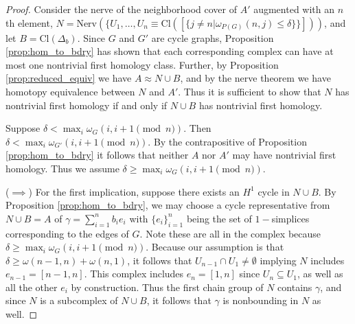 \documentclass[pdflatex,bst/sn-mathphys-num]{sn-jnl}%
\newcommand{\toti}[1] {{\textcolor{pink}{{\sf Tobias: } #1}}}
\theoremstyle{thmstyleone}%
\theoremstyle{definition}
\theoremstyle{thmstyletwo}%
\theoremstyle{thmstylethree}%
\begin{document}
\begin{proof}
     Consider the nerve of the neighborhood cover of $A'$ augmented with an $n$th element, $N=$Nerv$\left(\{U_1,\dotsc,U_n\equiv\text{Cl}([\{j\neq n | \omega_{P(G)}(n,j)\leq \delta\}\}])\right)$, and let $B=\text{Cl}(\Delta_b)$. Since $G$ and $G'$ are cycle graphs, Proposition \ref{prop:hom_to_bdry} has shown that each corresponding complex can have at most one nontrivial first homology class. Further, by Proposition \ref{prop:reduced_equiv} we have $A\approx N\cup B$, and by the nerve theorem we have homotopy equivalence between $N$ and $A'$. Thus it is sufficient to show that $N$ has nontrivial first homology if and only if $N\cup B$ has nontrivial first homology. 

     Suppose $\delta<\max_i \omega_G(i,i+1\pmod{n})$. Then $\delta<\max_i \omega_{G'}(i,i+1\pmod{n})$. By the contrapositive of Proposition \ref{prop:hom_to_bdry} it follows that neither $A$ nor $A'$ may have nontrivial first homology. Thus we assume $\delta\geq \max_i \omega_G(i,i+1\pmod{n})$.

     ($\implies$) For the first implication, suppose there exists an $H^1$ cycle in $N\cup B$. By Proposition \ref{prop:hom_to_bdry}, we may choose a cycle representative from $N\cup B= A$ of $\gamma=\sum_{i=1}^n b_i e_i$ with $\{e_i\}_{i=1}^n$ being the set of $1-$simplices corresponding to the edges of $G$. Note these are all in the complex because $\delta\geq \max_i \omega_G(i,i+1\pmod{n})$. Because our assumption is that $\delta\geq \omega(n-1,n)+\omega(n,1)$, it follows that $U_{n-1}\cap U_1\neq \emptyset$ implying $N$ includes $e_{n-1}=[n-1,n]$. This complex includes $e_n=[1,n]$ since $U_n\subseteq U_1$, as well as all the other $e_i$ by construction. Thus the first chain group of $N$ contains $\gamma$, and since $N$ is a subcomplex of $N\cup B$, it follows that $\gamma$ is nonbounding in $N$ as well.

    



\end{proof}
\end{document}
